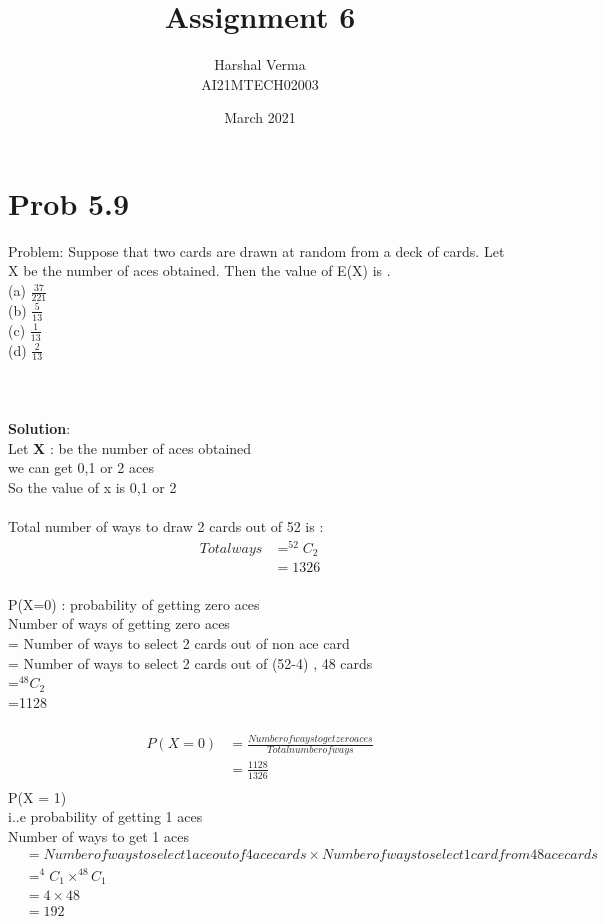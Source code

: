 \documentclass[journal,12pt,twocolumn]{IEEEtran}
\title{Assignment 6 }
\author{Harshal Verma\\
AI21MTECH02003}
\date{March 2021}
\begin{document}
\maketitle
\section{Prob 5.9}
Problem: Suppose that two cards are drawn at random
from a deck of cards. Let X be the number of
aces obtained. Then the value of E(X) is .\\
(a) $\frac{37}{221}$\\
(b) $\frac{5}{13}$\\
(c) $\frac{1}{13}$\\
(d) $\frac{2}{13}$\\
\\
\\
\\
\textbf{Solution}:\\
Let \textbf{X} : be the number of aces obtained \\
we can get 0,1 or 2 aces \\
So the value of x is 0,1 or 2 \\
\\
Total number of ways to draw 2 cards out of 52 is :
\begin{align*}
Total ways &= ^{52}C_2\\
           &= 1326
\end{align*}
 \\
P(X=0) : probability of getting zero aces \\
Number of ways of getting zero aces \\
 = Number of ways to select 2 cards out of non ace card \\
 = Number of ways to select 2 cards out of (52-4) , 48 cards \\
 =$^{48}C_2$ \\
 =1128 \\
 \\
 \begin{align*}
 P(X = 0) &= \frac{Number of ways to get zero aces}{Total number of ways} \\
          &= \frac{1128}{1326} \\
 \end{align*}
 P(X = 1) \\
 i..e probability of getting 1 aces \\
 Number of ways to get 1 aces \\
\begin{align*}
    &= Number of ways to select 1 ace out of 4 ace cards \times Number of ways to select 1 card from 48 ace cards \\
    &= ^{4}C_1 \times ^{48}C_1 \\
    &= 4\times 48 \\
    &= 192 \\
\end{align*}
\end{document}
